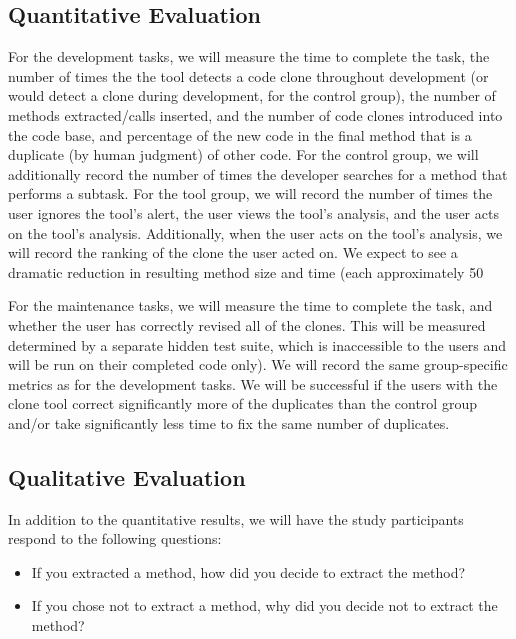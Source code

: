 \documentclass[preprint,10pt]{sigplanconf}
\begin{document}
\subsection{Quantitative Evaluation}
For the development tasks, we will measure the time to complete the
task, the number of times the the tool detects a code clone throughout development (or would
detect a clone during development, for the control group),
the number of methods extracted/calls inserted, and the number of code clones
introduced into the code base, and percentage of the new code in the final method
 that is a duplicate (by human judgment) of other code. 
For the control group, we will additionally
record the number of times the developer searches for a method that
performs a subtask. 
For the tool group, we will record the number of
times the user ignores the tool's
alert, the user views the tool's analysis, and the user acts on the
tool's analysis. Additionally, when the user acts on the tool's
analysis, we will record the ranking of the clone the user acted on.  We expect to see a dramatic reduction in resulting method size and time (each approximately 50%

For the maintenance tasks, we will measure the time to complete the
task, and whether the user has correctly revised all of the clones. This will be measured
determined by a separate  hidden test suite, which is inaccessible to the 
users and will be run on their completed code only). 
We will record the same
group-specific metrics as for the development tasks.
We will be successful if the users with the clone tool correct significantly more of the duplicates than the control group and/or take significantly less time to fix the same number of duplicates.

\subsection{Qualitative Evaluation}
In addition to the quantitative results, we will have the study
participants respond to the following questions:

\begin{itemize}
  \item If you extracted a method, how did you decide to extract the
    method? 
  \item If you chose not to extract a method, why did you decide not
    to extract the method?
\end{itemize}
\end{document}
